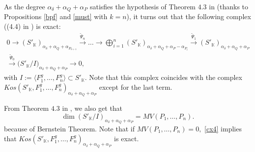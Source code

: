 \documentclass[a4paper,11pt]{amsart}
\newcommand{\K}{\mathbb{K}}
\numberwithin{thm}{section}
\numberwithin{equation}{section}
\theoremstyle{definition}
\theoremstyle{plain}
\begin{document}
As the degree $\alpha_\delta+\alpha_Q+\alpha_P$ satisfies the hypothesis
of Theorem $4.3$ in \cite{BT22} (thanks to Propositions \ref{bpf} and  \ref{must} with $k=n$), it turns out that  the following complex ((4.4) in \cite{BT22}) is exact:
\begin{equation}\label{cx4}
\begin{array}{r}
0\to{(S'_\K)}_{\alpha_\delta+\alpha_Q+\alpha_{P_{n+1}}}\stackrel{\tilde{\Psi}_{n}}{\to}\ldots\to\bigoplus\limits_{i=1}^n (S'_\K)_{\alpha_\delta+\alpha_Q+\alpha_P-\alpha_{P_i}}\stackrel{\tilde{\Psi}_{1}}{\to} (S'_\K)_{\alpha_\delta+\alpha_Q+\alpha_P} \quad\\
\stackrel{\tilde{\Psi}_{0}}{\to}  \big(S'_\K/I\big)_{\alpha_\delta+\alpha_Q+\alpha_P}\to0,
\end{array}
\end{equation}
with $I:=\langle F^g_1,\ldots, F^g_n\rangle\subset S'_\K.$ Note that this complex coincides with the complex $Kos(S'_\K,F^g_1,\ldots, F^g_{n})_{\alpha_\delta+\alpha_Q+\alpha_P}$ except for the last term.


From Theorem $4.3$ in \cite{BT22}, we also get that
\begin{equation}\label{mv}
\dim\left(S'_\K/I\right)_{\alpha_\delta+\alpha_Q+\alpha_P}=MV(P_1,\ldots, P_n).
\end{equation} because of Bernstein Theorem.  Note that if $MV(P_1,\ldots, P_n)=0,$  \eqref{cx4}  implies that $Kos(S'_\K,F^g_1,\ldots, F^g_{n})_{\alpha_\delta+\alpha_Q+\alpha_P}$  is exact.
\end{document}
